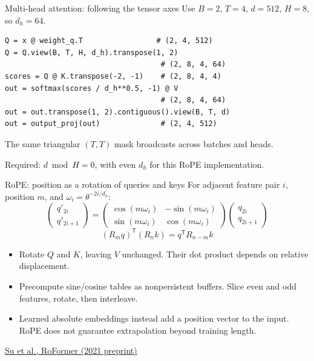 \documentclass[11pt,aspectratio=169]{beamer}
\newcommand{\paper}[2]{\par{\scriptsize\color{muted}\href{#2}{#1}\par}}
\begin{document}
\begin{frame}[fragile]{Multi-head attention: following the tensor axes}
Use $B=2$, $T=4$, $d=512$, $H=8$, so $d_h=64$.
\begin{lstlisting}
Q = x @ weight_q.T                 # (2, 4, 512)
Q = Q.view(B, T, H, d_h).transpose(1, 2)
                                    # (2, 8, 4, 64)
scores = Q @ K.transpose(-2, -1)    # (2, 8, 4, 4)
out = softmax(scores / d_h**0.5, -1) @ V
                                    # (2, 8, 4, 64)
out = out.transpose(1, 2).contiguous().view(B, T, d)
out = output_proj(out)              # (2, 4, 512)
\end{lstlisting}
The same triangular $(T,T)$ mask broadcasts across batches and heads.\par
\alert{Required:} $d\bmod H=0$, with even $d_h$ for this RoPE implementation.
\end{frame}

\begin{frame}{RoPE: position as a rotation of queries and keys}
For adjacent feature pair $i$, position $m$, and $\omega_i=\theta^{-2i/d_h}$:
\[
\begin{pmatrix}q'_{2i}\\q'_{2i+1}\end{pmatrix}
=\begin{pmatrix}\cos(m\omega_i)&-\sin(m\omega_i)\\
\sin(m\omega_i)&\cos(m\omega_i)\end{pmatrix}
\begin{pmatrix}q_{2i}\\q_{2i+1}\end{pmatrix}
\]
\[
(R_mq)^{\mathsf T}(R_nk)=q^{\mathsf T}R_{n-m}k
\]
\begin{itemize}
\item Rotate $Q$ and $K$, leaving $V$ unchanged. Their dot product depends on relative displacement.
\item Precompute sine/cosine tables as nonpersistent buffers. Slice even and odd features, rotate, then interleave.
\item Learned absolute embeddings instead add a position vector to the input. RoPE does not guarantee extrapolation beyond training length.
\end{itemize}
\paper{Su et al., RoFormer (2021 preprint)}{https://arxiv.org/abs/2104.09864}
\end{frame}
\end{document}
